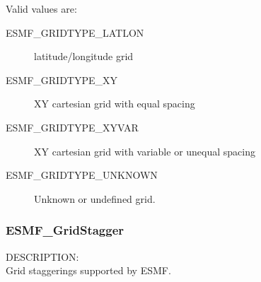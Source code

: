 Valid values are:
\begin{description}
   \item [ESMF\_GRIDTYPE\_LATLON]
         latitude/longitude grid

   \item [ESMF\_GRIDTYPE\_XY]
         XY cartesian grid with equal spacing

   \item [ESMF\_GRIDTYPE\_XYVAR]
         XY cartesian grid with variable or unequal spacing

   \item [ESMF\_GRIDTYPE\_UNKNOWN]
         Unknown or undefined grid.

\end{description}

\subsubsection{ESMF\_GridStagger}

{\sf DESCRIPTION:\\}
Grid staggerings supported by ESMF.

